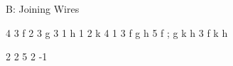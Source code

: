 \begin{problem}{B: Joining Wires}
\end{problem}

\begin{formalin}
\end{formalin}

\begin{formalout}
\end{formalout}

\begin{datain}
4 3
f 2 3
g 3 1
h 1 2
k 4 1
3 f g h
5 f ; g k h 
3 f k h
\end{datain}
\begin{dataout}
2 2
5 2
-1
\end{dataout}
